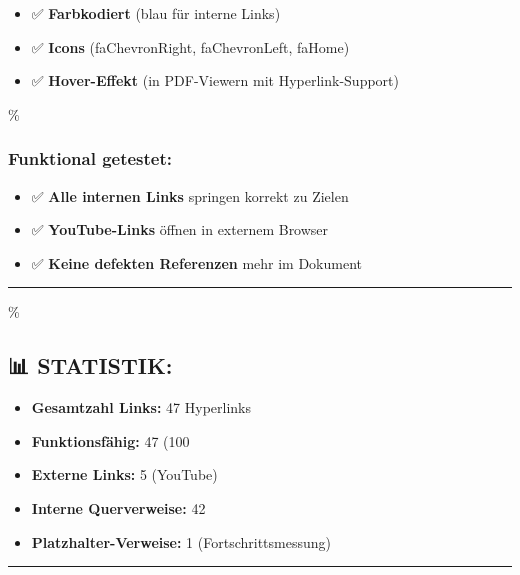 \begin{itemize}
\tightlist
\item
  ✅ \textbf{Farbkodiert} (blau für interne Links)
\item
  ✅ \textbf{Icons} (faChevronRight, faChevronLeft, faHome)
\item
  ✅ \textbf{Hover-Effekt} (in PDF-Viewern mit Hyperlink-Support)
\end{itemize}

\hypertarget{funktional-getestet}{\%
\subsubsection{\texorpdfstring{\textbf{Funktional getestet:}}{Funktional getestet:}}\label{funktional-getestet}}

\begin{itemize}
\tightlist
\item
  ✅ \textbf{Alle internen Links} springen korrekt zu Zielen
\item
  ✅ \textbf{YouTube-Links} öffnen in externem Browser
\item
  ✅ \textbf{Keine defekten Referenzen} mehr im Dokument
\end{itemize}

\begin{center}\rule{0.5\linewidth}{0.5pt}\end{center}

\hypertarget{statistik}{\%
\subsection{\texorpdfstring{📊 \textbf{STATISTIK:}}{📊 STATISTIK:}}\label{statistik}}

\begin{itemize}
\tightlist
\item
  \textbf{Gesamtzahl Links:} 47 Hyperlinks
\item
  \textbf{Funktionsfähig:} 47 (100\\%
\item
  \textbf{Externe Links:} 5 (YouTube)
\item
  \textbf{Interne Querverweise:} 42
\item
  \textbf{Platzhalter-Verweise:} 1 (Fortschrittsmessung)
\end{itemize}

\begin{center}\rule{0.5\linewidth}{0.5pt}\end{center}


